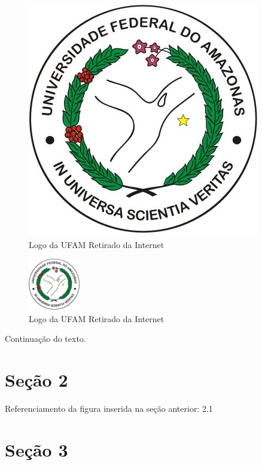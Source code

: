		\begin{figure}[!ht]
			\begin{center}
			    \includegraphics[scale=0.5]{abntex2/ufam-logo}
			\end{center}
			\caption{\label{fig_grafico}Logo da UFAM Retirado da Internet}
		\end{figure}
		
		\begin{figure}[h]
	        \begin{center}
		        \includegraphics[width=0.2\textwidth]{abntex2/ufam-logo}
	        \end{center}
	        \caption{\label{fig:logoUfam}Logo da UFAM Retirado da Internet}
        \end{figure}
		
		
		Continuação do texto.
		
	\section{Seção 2}
	
		Referenciamento da figura inserida na seção anterior: 2.1
		
	\section{Seção 3}
	
